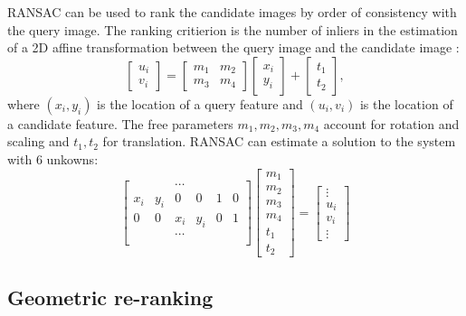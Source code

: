 RANSAC can be used to rank the candidate images by order of consistency with the query image. The ranking critierion is the number of inliers in the estimation of a 2D affine transformation between the query image and the candidate image \cite{ransac_gcc}:
\begin{equation}
\begin{bmatrix}
u_i \\ v_i
\end{bmatrix}
=
\begin{bmatrix}
m_1 & m_2 \\
m_3 & m_4
\end{bmatrix}
\begin{bmatrix}
x_i \\ y_i
\end{bmatrix}
+
\begin{bmatrix}
t_1 \\ t_2
\end{bmatrix},
\end{equation}
where $(x_i,y_i)$ is the location of a query feature and $(u_i,v_i)$ is the location of a candidate feature. The free parameters $m_1,m_2,m_3,m_4$ account for rotation and scaling and $t_1,t_2$ for translation. RANSAC can estimate a solution to the system with 6 unkowns:
\begin{equation}
\begin{bmatrix}
 & & \cdots \\
x_i & y_i & 0 & 0 & 1 & 0 \\
0 & 0 & x_i & y_i & 0 & 1 \\
 & & \cdots \\
\end{bmatrix}
\begin{bmatrix}
m_1 \\ m_2 \\ m_3 \\ m_4 \\ t_1 \\ t_2
\end{bmatrix}
=
\begin{bmatrix}
\vdots \\
u_i \\
v_i \\
\vdots
\end{bmatrix}
\end{equation}

\subsection{Geometric re-ranking}

